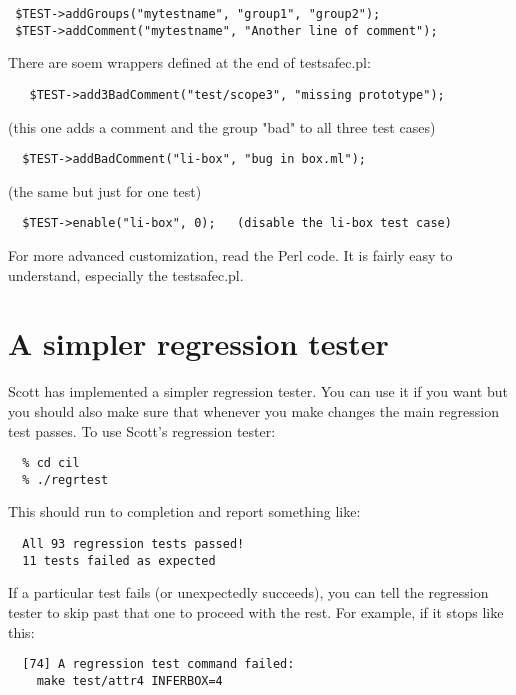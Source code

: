 \documentclass{book}
\begin{document}
\begin{verbatim}
 $TEST->addGroups("mytestname", "group1", "group2");
 $TEST->addComment("mytestname", "Another line of comment");
\end{verbatim}

 There are soem wrappers defined at the end of testsafec.pl:

\begin{verbatim}
   $TEST->add3BadComment("test/scope3", "missing prototype");
\end{verbatim}%

 (this one adds a comment and the group "bad" to all three test cases)

\begin{verbatim}
  $TEST->addBadComment("li-box", "bug in box.ml");
\end{verbatim}%

 (the same but just for one test)
   
\begin{verbatim}
  $TEST->enable("li-box", 0);   (disable the li-box test case)
\end{verbatim}%


 For more advanced customization, read the Perl code. It is fairly easy to
 understand, especially the testsafec.pl. 

 \section{A simpler regression tester}
        
 Scott has implemented a simpler regression tester. You can use it if you want
 but you should also make sure that whenever you make changes the main
 regression test passes. To use Scott's regression tester:

\begin{verbatim}
  % cd cil
  % ./regrtest
\end{verbatim}

This should run to completion and report something like:

\begin{verbatim}
  All 93 regression tests passed!
  11 tests failed as expected
\end{verbatim}

If a particular test fails (or unexpectedly succeeds), you can tell
the regression tester to skip past that one to proceed with the rest.
For example, if it stops like this:

\begin{verbatim}
  [74] A regression test command failed:
    make test/attr4 INFERBOX=4
\end{verbatim}
\end{document}

